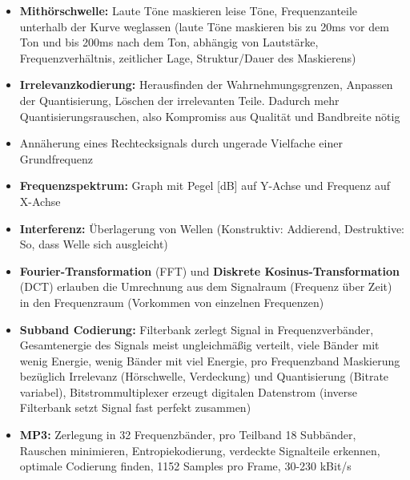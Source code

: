 \documentclass[12pt,landscape]{article}
\begin{document}
\begin{multicols}{3}
\begin{itemize}
\item \textbf{Mithörschwelle:} Laute Töne maskieren leise Töne, Frequenzanteile unterhalb der Kurve weglassen (laute Töne maskieren bis zu 20ms vor dem Ton und bis 200ms nach dem Ton, abhängig von Lautstärke, Frequenzverhältnis, zeitlicher Lage, Struktur/Dauer des Maskierens)
\item \textbf{Irrelevanzkodierung:} Herausfinden der Wahrnehmungsgrenzen, Anpassen der Quantisierung, Löschen der irrelevanten Teile. Dadurch mehr Quantisierungsrauschen, also Kompromiss aus Qualität und Bandbreite nötig
\item Annäherung eines Rechtecksignals durch ungerade Vielfache einer Grundfrequenz
\item \textbf{Frequenzspektrum:} Graph mit Pegel [dB] auf Y-Achse und Frequenz auf X-Achse
\item \textbf{Interferenz:} Überlagerung von Wellen (Konstruktiv: Addierend, Destruktive: So, dass Welle sich ausgleicht)
\item \textbf{Fourier-Transformation} (FFT) und \textbf{Diskrete Kosinus-Transformation} (DCT) erlauben die Umrechnung aus dem Signalraum (Frequenz über Zeit) in den Frequenzraum (Vorkommen von einzelnen Frequenzen)
\item \textbf{Subband Codierung:} Filterbank zerlegt Signal in Frequenzverbänder, Gesamtenergie des Signals meist ungleichmäßig verteilt, viele Bänder mit wenig Energie, wenig Bänder mit viel Energie, pro Frequenzband Maskierung bezüglich Irrelevanz (Hörschwelle, Verdeckung) und Quantisierung (Bitrate variabel), Bitstrommultiplexer erzeugt digitalen Datenstrom (inverse Filterbank setzt Signal fast perfekt zusammen)
\item \textbf{MP3:} Zerlegung in 32 Frequenzbänder, pro Teilband 18 Subbänder, Rauschen minimieren, Entropiekodierung, verdeckte Signalteile erkennen, optimale Codierung finden, 1152 Samples pro Frame, 30-230 kBit/s

\end{itemize}
\end{multicols}
\end{document}
